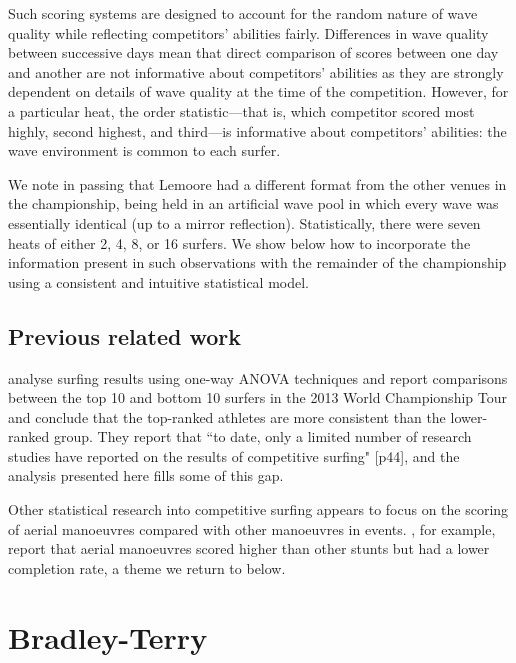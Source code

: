 \documentclass{article}
\begin{document}
Such scoring systems are designed to account for the random nature of
wave quality while reflecting competitors' abilities fairly.
Differences in wave quality between successive days mean that direct
comparison of scores between one day and another are not informative
about competitors' abilities as they are strongly dependent on details
of wave quality at the time of the competition.  However, for a
particular heat, the order statistic---that is, which competitor
scored most highly, second highest, and third---is informative about
competitors' abilities: the wave environment is common to each surfer.

We note in passing that Lemoore had a different format from the other
venues in the championship, being held in an artificial wave pool in
which every wave was essentially identical (up to a mirror
reflection).  Statistically, there were seven heats of either 2, 4, 8,
or 16 surfers.  We show below how to incorporate the information
present in such observations with the remainder of the championship
using a consistent and intuitive statistical model.

\subsection{Previous related work}

\citet{farley2013} analyse surfing results using
one-way ANOVA techniques and report comparisons between the top 10 and
bottom 10 surfers in the 2013 World Championship Tour and conclude
that the top-ranked athletes are more consistent than the lower-ranked
group.  They report that ``to date, only a limited number of research
studies have reported on the results of competitive surfing" [p44],
and the analysis presented here fills some of this gap.

Other statistical research into competitive surfing appears to focus
on the scoring of aerial manoeuvres compared with other manoeuvres in
events.  \citet{lundgren2014}, for example,
report that aerial manoeuvres scored higher than other stunts but had
a lower completion rate, a theme we return to below.

\section{Bradley-Terry}
\end{document}
